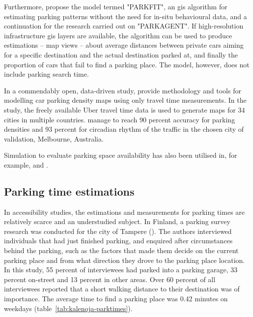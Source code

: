 Furthermore,  propose the model termed "PARKFIT", an \acrshort{gis} algorithm for estimating parking patterns without the need for in-situ behavioural data, and a continuation for the research carried out on "PARKAGENT". If high-resolution infrastructure \acrshort{gis} layers are available, the algorithm can be used to produce estimations -- map views -- about average distances between private cars aiming for a specific destination and the actual destination parked at, and finally the proportion of cars that fail to find a parking place. The model, however, does not include parking search time.

In a commendably open, data-driven study,  provide methodology and tools for modelling car parking density maps using only travel time measurements. In the study, the freely available Uber travel time data is used to generate maps for 34 cities in multiple countries. \citeauthor{Aryandoust2019} manage to reach 90 percent accuracy for parking densities and 93 percent for circadian rhythm of the traffic in the chosen city of validation, Melbourne, Australia.

Simulation to evaluate parking space availability has also been utilised in, for example,  and .

\newpage
\subsection{Parking time estimations}
\justify

In accessibility studies, the estimations and measurements for parking times are relatively scarce and an understudied subject. In Finland, a parking survey research was conducted for the city of Tampere (\cite{Kalenoja2003}). The authors interviewed individuals that had just finished parking, and enquired after circumstances behind the parking, such as the factors that made them decide on the current parking place and from what direction they drove to the parking place location. In this study, 55 percent of interviewees had parked into a parking garage, 33 percent on-street and 13 percent in other areas. Over 60 percent of all interviewees reported that a short walking distance to their destination was of importance. The average time to find a parking place was 0.42 minutes on weekdays (table~\ref{tab:kalenoja-parktimes}).

